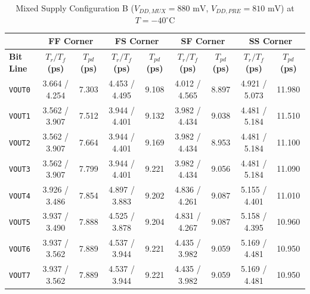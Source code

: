 \begin{table}[H]
    \centering
    \renewcommand{\arraystretch}{1.3}
    \setlength{\tabcolsep}{4pt}
    \small
    \begin{tabular}{|l|cc|cc|cc|cc|}
        \hline
        & \multicolumn{2}{c|}{\textbf{FF Corner}} & \multicolumn{2}{c|}{\textbf{FS Corner}} & \multicolumn{2}{c|}{\textbf{SF Corner}} & \multicolumn{2}{c|}{\textbf{SS Corner}} \\ \hline
        \textbf{Bit Line} & \textbf{$T_r / T_f$ (ps)} & \textbf{$T_{pd}$ (ps)} & \textbf{$T_r / T_f$ (ps)} & \textbf{$T_{pd}$ (ps)} & \textbf{$T_r / T_f$ (ps)} & \textbf{$T_{pd}$ (ps)} & \textbf{$T_r / T_f$ (ps)} & \textbf{$T_{pd}$ (ps)} \\ \hline
        \texttt{VOUT0} & 3.664 / 4.254 & 7.303 & 4.453 / 4.495 & 9.108 & 4.012 / 4.565 & 8.897 & 4.921 / 5.073 & 11.980 \\ 
        \texttt{VOUT1} & 3.562 / 3.907 & 7.512 & 3.944 / 4.401 & 9.132 & 3.982 / 4.434 & 9.038 & 4.481 / 5.184 & 11.510 \\ 
        \texttt{VOUT2} & 3.562 / 3.907 & 7.664 & 3.944 / 4.401 & 9.169 & 3.982 / 4.434 & 8.953 & 4.481 / 5.184 & 11.100 \\ 
        \texttt{VOUT3} & 3.562 / 3.907 & 7.799 & 3.944 / 4.401 & 9.221 & 3.982 / 4.434 & 9.056 & 4.481 / 5.184 & 11.090 \\ 
        \texttt{VOUT4} & 3.926 / 3.486 & 7.854 & 4.897 / 3.883 & 9.202 & 4.836 / 4.261 & 9.087 & 5.155 / 4.401 & 11.010 \\ 
        \texttt{VOUT5} & 3.937 / 3.490 & 7.888 & 4.525 / 3.878 & 9.204 & 4.831 / 4.267 & 9.087 & 5.158 / 4.395 & 10.960 \\ 
        \texttt{VOUT6} & 3.937 / 3.562 & 7.889 & 4.537 / 3.944 & 9.221 & 4.435 / 3.982 & 9.059 & 5.169 / 4.481 & 10.950 \\ 
        \texttt{VOUT7} & 3.937 / 3.562 & 7.889 & 4.537 / 3.944 & 9.221 & 4.435 / 3.982 & 9.059 & 5.169 / 4.481 & 10.950 \\ \hline
    \end{tabular}
    \vspace{2mm}
    \caption{Mixed Supply Configuration B ($V_{DD,MUX} = 880\text{ mV}$, $V_{DD,PRE} = 810\text{ mV}$) at $T = -40^{\circ}\text{C}$}
    \label{tab:asym_b_40}
\end{table}

